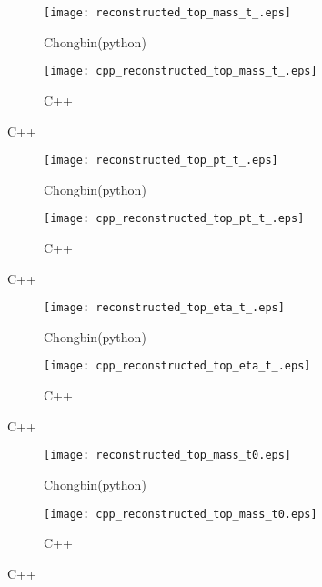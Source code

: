 \documentclass{beamer}
\begin{document}
\begin{frame}
  \begin{figure}[!h]
  \captionsetup[subfigure]{labelformat=empty}
  \begin{subfigure}{.5\textwidth}
  \centering
  \texttt{[image: reconstructed\_top\_mass\_t\_.eps]}
  \caption{Chongbin(python)}
  \end{subfigure} \hfill
  \begin{subfigure}{.5\textwidth}
  \centering
  \texttt{[image: cpp\_reconstructed\_top\_mass\_t\_.eps]}
  \caption{C++}
  \end{subfigure}
  \end{figure}
\end{frame}

\begin{frame}
  \begin{figure}[!h]
  \captionsetup[subfigure]{labelformat=empty}
  \begin{subfigure}{.5\textwidth}
  \centering
  \texttt{[image: reconstructed\_top\_pt\_t\_.eps]}
  \caption{Chongbin(python)}
  \end{subfigure} \hfill
  \begin{subfigure}{.5\textwidth}
  \centering
  \texttt{[image: cpp\_reconstructed\_top\_pt\_t\_.eps]}
  \caption{C++}
  \end{subfigure}
  \end{figure}
\end{frame}

\begin{frame}
  \begin{figure}[!h]
  \captionsetup[subfigure]{labelformat=empty}
  \begin{subfigure}{.5\textwidth}
  \centering
  \texttt{[image: reconstructed\_top\_eta\_t\_.eps]}
  \caption{Chongbin(python)}
  \end{subfigure} \hfill
  \begin{subfigure}{.5\textwidth}
  \centering
  \texttt{[image: cpp\_reconstructed\_top\_eta\_t\_.eps]}
  \caption{C++}
  \end{subfigure}
  \end{figure}
\end{frame}

\begin{frame}
  \begin{figure}[!h]
  \captionsetup[subfigure]{labelformat=empty}
  \begin{subfigure}{.5\textwidth}
  \centering
  \texttt{[image: reconstructed\_top\_mass\_t0.eps]}
  \caption{Chongbin(python)}
  \end{subfigure} \hfill
  \begin{subfigure}{.5\textwidth}
  \centering
  \texttt{[image: cpp\_reconstructed\_top\_mass\_t0.eps]}
  \caption{C++}
  \end{subfigure}
  \end{figure}
\end{frame}
\end{document}
